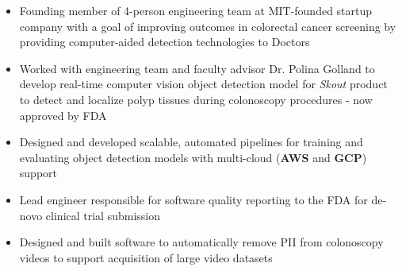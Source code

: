 \documentclass[10pt,a4paper]{altacv}
\begin{document}

\begin{itemize}
\item Founding member of 4-person engineering team at MIT-founded startup company with a goal of improving outcomes in colorectal cancer screening by providing computer-aided detection technologies to Doctors
\item Worked with engineering team and faculty advisor Dr. Polina Golland to develop real-time computer vision object detection model for \textit{Skout} product to detect and localize polyp tissues during colonoscopy procedures - now approved by FDA 
\item Designed and developed scalable, automated pipelines for training and evaluating object detection models with multi-cloud (\textbf{AWS} and \textbf{GCP}) support 
\item Lead engineer responsible for software quality reporting to the FDA for de-novo clinical trial submission 
\item Designed and built software to automatically remove PII from colonoscopy videos to support acquisition of large video datasets 
\end{itemize}




\end{document}
